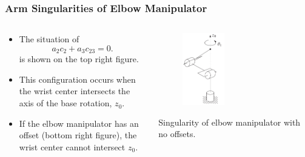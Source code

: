 \begin{frame}
    \frametitle{Arm Singularities of Elbow Manipulator}

    \begin{columns}
        \begin{column}{0.6\textwidth}
            \begin{itemize}
                \item The situation of 
                \[ a_2c_2 + a_3c_{23} = 0. \]
                is shown on the top right figure.
                \item This configuration occurs when the wrist center intersects
                the axis of the base rotation, $z_0$.
                \item If the elbow manipulator has an offset (bottom right
                figure), the wrist center cannot intersect $z_0$.
            \end{itemize}
        \end{column}
        \begin{column}{0.4\textwidth}
            \begin{figure}[bth]
                \centering
                \includegraphics[width=0.4\textwidth]{figures/elbow_sing_no_offset.png} 
            \end{figure}
            \vspace{-2mm}
            \centering
            \footnotesize{Singularity of elbow manipulator with no offsets.}


\end{column}
\end{columns}
\end{frame}
